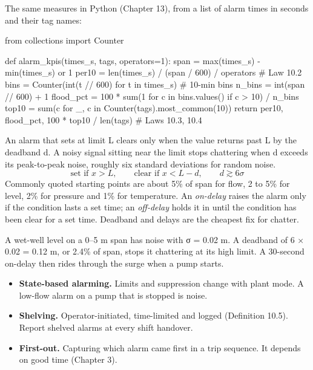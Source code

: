 The same measures in Python (Chapter 13), from a list of alarm times in seconds and their tag names:
\begin{code}
from collections import Counter

def alarm_kpis(times_s, tags, operators=1):
    span = max(times_s) - min(times_s) or 1
    per10 = len(times_s) / (span / 600) / operators    # Law 10.2
    bins = Counter(int(t // 600) for t in times_s)      # 10-min bins
    n_bins = int(span // 600) + 1
    flood_pct = 100 * sum(1 for c in bins.values() if c > 10) / n_bins
    top10 = sum(c for _, c in Counter(tags).most_common(10))
    return per10, flood_pct, 100 * top10 / len(tags)    # Laws 10.3, 10.4
\end{code}

 An alarm that sets at limit L clears only when the value returns past L by the deadband d. A noisy signal sitting near the limit stops chattering when d exceeds its peak-to-peak noise, roughly six standard deviations for random noise.
\[ \text{set if } x > L, \qquad \text{clear if } x < L - d, \qquad d \gtrsim 6\sigma \]
Commonly quoted starting points are about 5\% of span for flow, 2 to 5\% for level, 2\% for pressure and 1\% for temperature. An \emph{on-delay} raises the alarm only if the condition lasts a set time; an \emph{off-delay} holds it in until the condition has been clear for a set time. Deadband and delays are the cheapest fix for chatter.

 A wet-well level on a 0–5 m span has noise with σ = 0.02 m. A deadband of 6 × 0.02 = 0.12 m, or 2.4\% of span, stops it chattering at its high limit. A 30-second on-delay then rides through the surge when a pump starts.

\begin{itemize}
\item \textbf{State-based alarming.} Limits and suppression change with plant mode. A low-flow alarm on a pump that is stopped is noise.
\item \textbf{Shelving.} Operator-initiated, time-limited and logged (Definition 10.5). Report shelved alarms at every shift handover.
\item \textbf{First-out.} Capturing which alarm came first in a trip sequence. It depends on good time (Chapter 3).
\end{itemize}

